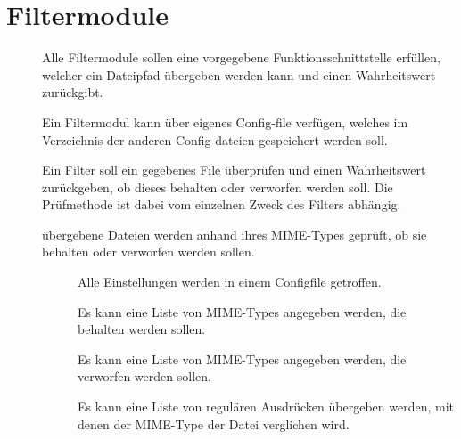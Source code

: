\section{Filtermodule}
\begin{description}
	\item []
		Alle Filtermodule sollen eine vorgegebene Funktionsschnittstelle erfüllen, 
		welcher ein Dateipfad übergeben werden kann und einen Wahrheitswert zurückgibt.
	\item []
		Ein Filtermodul kann über eigenes Config-file verfügen, welches im Verzeichnis
		der anderen Config-dateien gespeichert werden soll.
	\item []
		Ein Filter soll ein gegebenes File überprüfen und einen Wahrheitswert zurückgeben,
		ob dieses behalten oder verworfen werden soll.
		Die Prüfmethode ist dabei vom einzelnen Zweck des Filters abhängig.
	\item []
		übergebene Dateien werden anhand ihres MIME-Types geprüft, ob sie behalten oder verworfen werden sollen.
		\begin{description}
			\item []
				Alle Einstellungen werden in einem Configfile getroffen.
			\item []
				Es kann eine Liste von MIME-Types angegeben werden, die behalten werden sollen. 
			\item []
				Es kann eine Liste von MIME-Types angegeben werden, die verworfen werden sollen. 
			\item []
				Es kann eine Liste von regulären Ausdrücken übergeben werden, mit denen der
				MIME-Type der Datei verglichen wird.
		\end{description}
\end{description}

